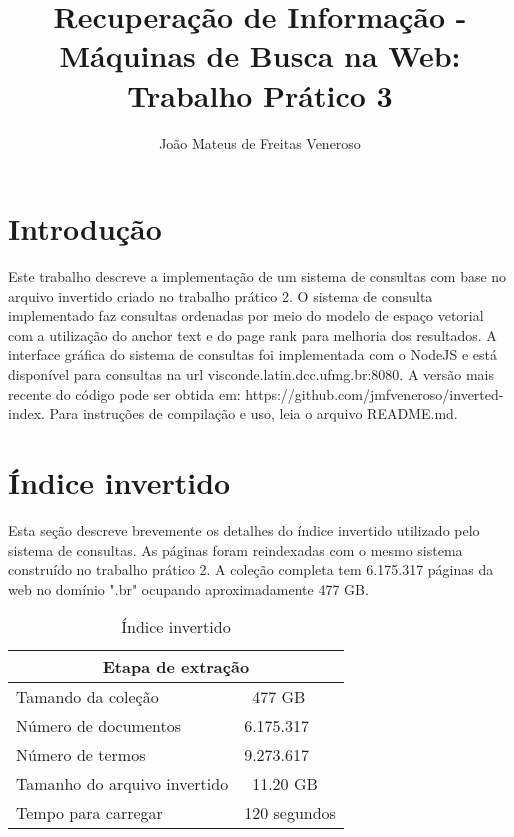 \documentclass{article}
\begin{document}
\title{Recuperação de Informação - Máquinas de Busca na Web: Trabalho Prático 3}
\author{João Mateus de Freitas Veneroso}

\maketitle

\section{Introdução}

Este trabalho descreve a implementação de um sistema de consultas com base no arquivo
invertido criado no trabalho prático 2. O sistema de consulta implementado faz 
consultas ordenadas por meio do modelo de espaço vetorial com a utilização do
anchor text e do page rank para melhoria dos resultados. A interface gráfica do sistema
de consultas foi implementada com o NodeJS e está disponível para consultas na
url visconde.latin.dcc.ufmg.br:8080. A versão mais recente do código pode ser obtida
em: https://github.com/jmfveneroso/inverted-index. Para instruções de compilação e uso, leia
o arquivo README.md. 

\section{Índice invertido}

Esta seção descreve brevemente os detalhes do índice invertido utilizado pelo sistema
de consultas. As páginas foram reindexadas com o mesmo sistema construído no trabalho
prático 2. A coleção completa tem 6.175.317 páginas da web no domínio ".br" ocupando
aproximadamente 477 GB. 

\begin{table}
\centering
\begin{tabular}{ |l|l| }
  \hline
  \multicolumn{2}{|c|}{Etapa de extração} \\
  \hline
  Tamando da coleção & ~477 GB \\
  Número de documentos & 6.175.317 \\
  Número de termos & 9.273.617 \\
  Tamanho do arquivo invertido & ~11.20 GB \\
  Tempo para carregar & 120 segundos \\
  \hline
\end{tabular}
\caption{Índice invertido}
\label{tab:inverted_index}
\end{table}
\end{document}
